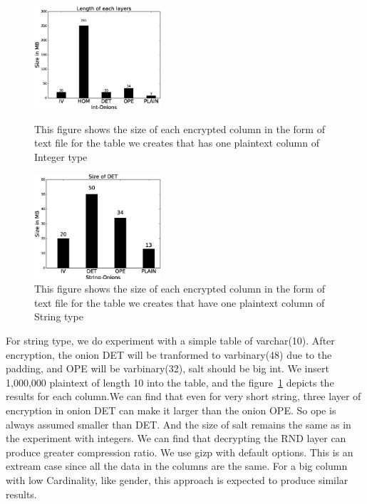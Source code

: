 


\begin{figure}   
  \begin{minipage}[t]{0.47\columnwidth}  
    \centering   

    \includegraphics[width=4.7cm]{images/size-of-each-onion.eps}   
    \caption{\small{This figure shows the size of each encrypted column in the form of text file for the table we creates that has one plaintext column of Integer type}} 
    \label{fig:stack11}   
  \end{minipage}%
  \hfill 
  \begin{minipage}[t]{0.47\columnwidth}   
    \centering   
    \includegraphics[width=4.7cm]{images/det-rnd.eps}   
    \caption{\small{This figure shows the size of each encrypted column in the form of text file for the table we creates that have one plaintext column of String type}} 
    \label{fig:stack12}   

  \end{minipage}   
\end{figure}





For string type, we do experiment with a simple table of varchar(10). After encryption, the onion DET will be tranformed to varbinary(48) due to the padding, and OPE will be varbinary(32), salt should be big int. We insert 1,000,000 plaintext of length 10 into the table, and the figure~\ref{fig:stack12} depicts the results for each column.We can find that even for very short string, three layer of encryption in onion DET can make it larger than the onion OPE. So ope is always assumed  smaller than DET. And the size of salt remains the same as in the experiment with integers. We can find that decrypting the RND layer can produce greater compression ratio. We use gizp with default options. This is an extream case since all the data in the columns are the same. For a big column with low Cardinality, like gender, this approach is expected to produce similar results. 


